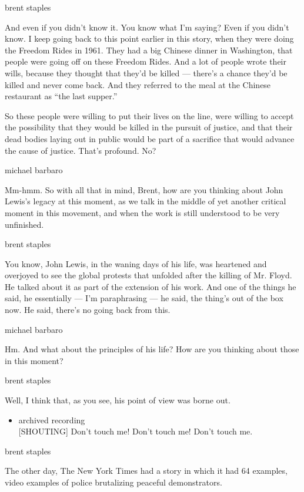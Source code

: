 brent staples

And even if you didn't know it. You know what I'm saying? Even if you
didn't know. I keep going back to this point earlier in this story, when
they were doing the Freedom Rides in 1961. They had a big Chinese dinner
in Washington, that people were going off on these Freedom Rides. And a
lot of people wrote their wills, because they thought that they'd be
killed --- there's a chance they'd be killed and never come back. And
they referred to the meal at the Chinese restaurant as ``the last
supper.''

So these people were willing to put their lives on the line, were
willing to accept the possibility that they would be killed in the
pursuit of justice, and that their dead bodies laying out in public
would be part of a sacrifice that would advance the cause of justice.
That's profound. No?

michael barbaro

Mm-hmm. So with all that in mind, Brent, how are you thinking about John
Lewis's legacy at this moment, as we talk in the middle of yet another
critical moment in this movement, and when the work is still understood
to be very unfinished.

brent staples

You know, John Lewis, in the waning days of his life, was heartened and
overjoyed to see the global protests that unfolded after the killing of
Mr. Floyd. He talked about it as part of the extension of his work. And
one of the things he said, he essentially --- I'm paraphrasing --- he
said, the thing's out of the box now. He said, there's no going back
from this.

michael barbaro

Hm. And what about the principles of his life? How are you thinking
about those in this moment?

brent staples

Well, I think that, as you see, his point of view was borne out.

\begin{itemize}
\tightlist
\item
  archived recording\\
  {[}SHOUTING{]} Don't touch me! Don't touch me! Don't touch me.
\end{itemize}

brent staples

The other day, The New York Times had a story in which it had 64
examples, video examples of police brutalizing peaceful demonstrators.

